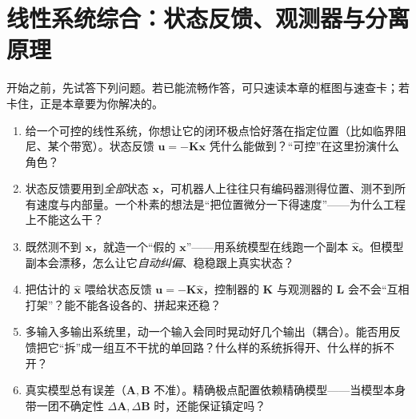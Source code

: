 \chapter{线性系统综合：状态反馈、观测器与分离原理}
\label{ch:linear-synthesis}


\begin{practice}[前置自测]
开始之前，先试答下列问题。若已能流畅作答，可只速读本章的框图与速查卡；若卡住，正是本章要为你解决的。
\begin{enumerate}
  \item 给一个可控的线性系统，你想让它的闭环极点恰好落在指定位置（比如临界阻尼、某个带宽）。状态反馈 $\mathbf u=-\mathbf K\mathbf x$ 凭什么能做到？“可控”在这里扮演什么角色？
  \item 状态反馈要用到\emph{全部}状态 $\mathbf x$，可机器人上往往只有编码器测得位置、测不到所有速度与内部量。一个朴素的想法是“把位置微分一下得速度”——为什么工程上不能这么干？
  \item 既然测不到 $\mathbf x$，就造一个“假的 $\mathbf x$”——用系统模型在线跑一个副本 $\hat{\mathbf x}$。但模型副本会漂移，怎么让它\emph{自动纠偏}、稳稳跟上真实状态？
  \item 把估计的 $\hat{\mathbf x}$ 喂给状态反馈 $\mathbf u=-\mathbf K\hat{\mathbf x}$，控制器的 $\mathbf K$ 与观测器的 $\mathbf L$ 会不会“互相打架”？能不能各设各的、拼起来还稳？
  \item 多输入多输出系统里，动一个输入会同时晃动好几个输出（耦合）。能否用反馈把它“拆”成一组互不干扰的单回路？什么样的系统拆得开、什么样的拆不开？
  \item 真实模型总有误差（$\mathbf A,\mathbf B$ 不准）。精确极点配置依赖精确模型——当模型本身带一团不确定性 $\Delta\mathbf A,\Delta\mathbf B$ 时，还能保证镇定吗？
\end{enumerate}
\end{practice}

